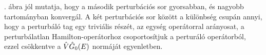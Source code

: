 . ábra jól mutatja, hogy a második perturbációs sor gyorsabban, és nagyobb tartományban konvergál. A két perturbációs sor között a különbség csupán annyi, hogy a perturbáló tag egy triviális részét, az egység operátorral arányosat, a perturbálatlan Hamilton-operátorhoz csoportosítjuk a perturáló operátorból, ezzel csökkentve a $\hat{V}\hat{G}_0(E)$ normáját  egyenletben.






